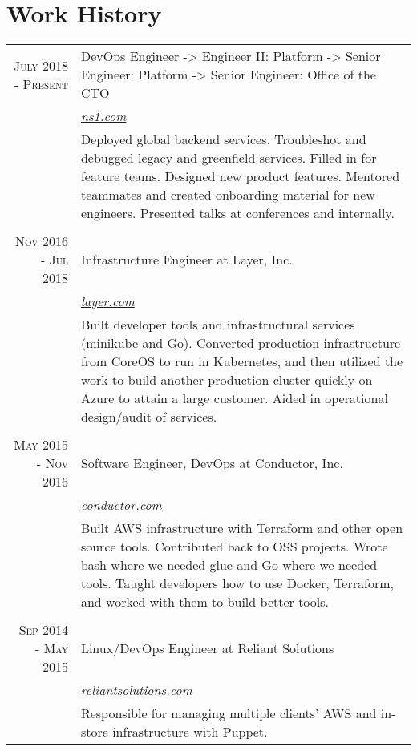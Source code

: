 \documentclass[a4paper, 10pt, onepage]{article} %
\begin{document}
\section{Work History}
\begin{tabular}{r|p{10cm}}
\textsc{July 2018 - Present} & {DevOps Engineer -> Engineer II: Platform -> Senior Engineer: Platform -> Senior Engineer: Office of the CTO}\\
&\small\emph{\href{https://ns1.com}{ns1.com}}\\
&\footnotesize{Deployed global backend services. Troubleshot and debugged legacy and greenfield services. Filled in for feature teams. Designed new product features. Mentored teammates and created onboarding material for new engineers. Presented talks at conferences and internally.}\\

\multicolumn{2}{c}{}\\
\textsc{Nov 2016 - Jul 2018} & {Infrastructure Engineer at Layer, Inc.}\\
&\small\emph{\href{https://layer.com}{layer.com}}\\
&\footnotesize{Built developer tools and infrastructural services (minikube and Go). Converted production infrastructure from CoreOS to run in Kubernetes, and then utilized the work to build another production cluster quickly on Azure to attain a large customer. Aided in operational design/audit of services.}\\

\multicolumn{2}{c}{}\\
\textsc{May 2015 - Nov 2016} & {Software Engineer, DevOps at Conductor, Inc.}\\
&\small\emph{\href{https://conductor.com}{conductor.com}}\\
&\footnotesize{Built AWS infrastructure with Terraform and other open source tools. Contributed back to OSS projects. Wrote bash where we needed glue and Go where we needed tools. Taught developers how to use Docker, Terraform, and worked with them to build better tools.}\\

\multicolumn{2}{c}{}\\
\textsc{Sep 2014 - May 2015} & {Linux/DevOps Engineer at Reliant Solutions}\\
&\small\emph{\href{https://reliantsolutions.com}{reliantsolutions.com}}\\
&\footnotesize{Responsible for managing multiple clients' AWS and in-store infrastructure with Puppet.}\\


\end{tabular}
\end{document}
